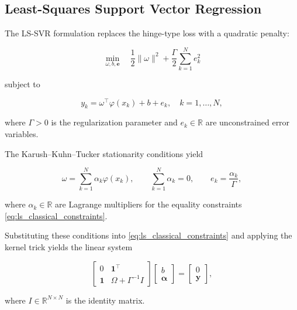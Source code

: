 \documentclass[mathematics,article,submit,pdftex,moreauthors]{Definitions/mdpi}
\begin{document}
\subsection{Least-Squares Support Vector Regression}\label{subsec:ls_classical}

The LS-SVR formulation \cite{Suykens1999,Suykens2002,Le2025,Liu2026} replaces the hinge-type loss with a quadratic penalty:
\begin{linenomath}
\begin{equation}\label{eq:ls_classical_primal}
\min_{\omega,b,\mathbf{e}}
\quad
\frac{1}{2}\|\omega\|^2
+
\frac{\Gamma}{2}\sum_{k=1}^N e_k^2
\end{equation}
\end{linenomath}
subject to
\begin{linenomath}
\begin{equation}\label{eq:ls_classical_constraints}
y_k = \omega^\top\varphi(x_k) + b + e_k, \quad k=1,\ldots,N,
\end{equation}
\end{linenomath}
where $\Gamma > 0$ is the regularization parameter and $e_k \in \mathbb{R}$ are unconstrained error variables.

The Karush--Kuhn--Tucker stationarity conditions yield
\begin{linenomath}
\begin{equation}\label{eq:ls_classical_stationarity}
\omega = \sum_{k=1}^N \alpha_k \varphi(x_k),
\qquad
\sum_{k=1}^N \alpha_k = 0,
\qquad
e_k = \frac{\alpha_k}{\Gamma},
\end{equation}
\end{linenomath}
where $\alpha_k \in \mathbb{R}$ are Lagrange multipliers for the equality constraints \eqref{eq:ls_classical_constraints}.

Substituting these conditions into \eqref{eq:ls_classical_constraints} and applying the kernel trick 
yields the linear system
\begin{linenomath}
\begin{equation}\label{eq:ls_classical_system}
\begin{bmatrix}
0 & \mathbf{1}^\top \\
\mathbf{1} & \Omega + \Gamma^{-1} I
\end{bmatrix}
\begin{bmatrix}
b \\ \boldsymbol{\alpha}
\end{bmatrix}
=
\begin{bmatrix}
0 \\ \mathbf{y}
\end{bmatrix},
\end{equation}
\end{linenomath}
where $I \in \mathbb{R}^{N \times N}$ is the identity matrix.
\end{document}
